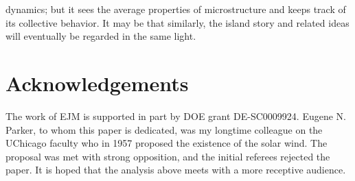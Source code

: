 \documentclass[11pt]{article}
\numberwithin{equation}{section}
\begin{document}
dynamics; but it sees the average properties of microstructure and keeps track of its collective behavior.  It may be that similarly, the island story and related ideas will eventually be regarded in the same light.






\vspace{1mm}

\section*{Acknowledgements}

%
%
The work of EJM is supported in part by DOE grant DE-SC0009924. 
Eugene N. Parker, to whom this paper is dedicated, was my longtime colleague on the UChicago faculty who in 1957 proposed the existence of the solar wind.  The proposal was met with strong opposition, and the initial referees rejected the paper.  It is hoped that the analysis above meets with a more receptive audience.



\vskip 3cm

      




\end{document}

